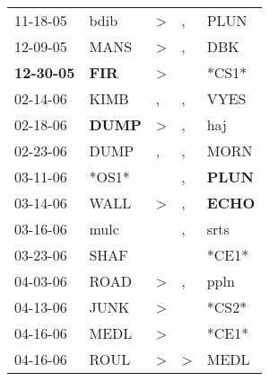 \begin{supertabular}{p{0.07\textwidth}p{0.06\textwidth}p{0.02\textwidth}p{0.02\textwidth}p{0.06\textwidth}}
          11-18-05\textsuperscript{} &           bdib\textsuperscript{} &     \textgreater &                , &           PLUN\textsuperscript{} \\
          12-09-05\textsuperscript{} &           MANS\textsuperscript{} &     \textgreater &                , &            DBK\textsuperscript{} \\
 \textbf{12-30-05\textsuperscript{}} &   \textbf{FIR\textsuperscript{}} &     \textgreater &                  &                            *CS1* \\
          02-14-06\textsuperscript{} &           KIMB\textsuperscript{} &                , &                , &           VYES\textsuperscript{} \\
          02-18-06\textsuperscript{} &  \textbf{DUMP\textsuperscript{}} &     \textgreater &                , &            haj\textsuperscript{} \\
          02-23-06\textsuperscript{} &           DUMP\textsuperscript{} &                , &                , &           MORN\textsuperscript{} \\
          03-11-06\textsuperscript{} &                            *OS1* &                  &                , &  \textbf{PLUN\textsuperscript{}} \\
          03-14-06\textsuperscript{} &           WALL\textsuperscript{} &     \textgreater &                , &  \textbf{ECHO\textsuperscript{}} \\
          03-16-06\textsuperscript{} &           mulc\textsuperscript{} &                  &                , &           srts\textsuperscript{} \\
          03-23-06\textsuperscript{} &           SHAF\textsuperscript{} &                  &                  &                            *CE1* \\
          04-03-06\textsuperscript{} &           ROAD\textsuperscript{} &     \textgreater &                , &           ppln\textsuperscript{} \\
          04-13-06\textsuperscript{} &           JUNK\textsuperscript{} &     \textgreater &                  &                            *CS2* \\
          04-16-06\textsuperscript{} &           MEDL\textsuperscript{} &     \textgreater &                  &                            *CE1* \\
          04-16-06\textsuperscript{} &           ROUL\textsuperscript{} &     \textgreater &     \textgreater &           MEDL\textsuperscript{} \\

\end{supertabular}
